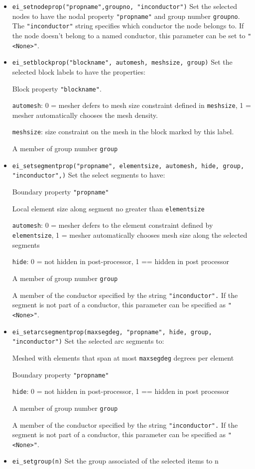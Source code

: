 \begin{itemize}
\item {\tt ei\_setnodeprop("propname",groupno, "inconductor")} Set the selected
nodes to have the nodal property \texttt{"propname"} and group
number \texttt{groupno}. The \texttt{"inconductor"} string
specifies which conductor the node belongs to. If the node doesn't
belong to a named conductor, this parameter can be set to
\texttt{"<None>"}.

\item {\tt ei\_setblockprop("blockname", automesh, meshsize, group)} Set the
selected block labels to have the properties:

Block property \texttt{"blockname"}.

\texttt{automesh}: 0 = mesher defers to mesh size constraint defined in
\texttt{meshsize}, 1 = mesher automatically chooses the mesh density.

\texttt{meshsize}: size constraint on the mesh in the block marked by this
label.

A member of group number \texttt{group}

\item {\tt ei\_setsegmentprop("propname", elementsize, automesh, hide, group,
"inconductor",)} Set the select segments to have:

Boundary property \texttt{"propname"}

Local element size along segment no greater than
\texttt{elementsize}

\texttt{automesh}: 0 = mesher defers to the element constraint defined by
\texttt{elementsize}, 1 = mesher automatically chooses mesh size along the
selected segments

\texttt{hide}: 0 = not hidden in post-processor, 1 == hidden in post
processor

A member of group number \texttt{group}

A member of the conductor specified by the string
\texttt{"inconductor".} If the segment is not part of a conductor,
this parameter can be specified as
\texttt{"<None>"}.

\item {\tt ei\_setarcsegmentprop(maxsegdeg, "propname", hide, group,
"inconductor")} Set the selected arc segments to:

Meshed with elements that span at most \texttt{maxsegdeg} degrees
per element

Boundary property \texttt{"propname"}

\texttt{hide}: 0 = not hidden in post-processor, 1 == hidden in post
processor

A member of group number \texttt{group}

A member of the conductor specified by the string
\texttt{"inconductor".} If the segment is not part of a conductor,
this parameter can be specified as
\texttt{"<None>"}.

\item{\tt ei\_setgroup(n)} Set the group associated of the selected items to n

\end{itemize}


